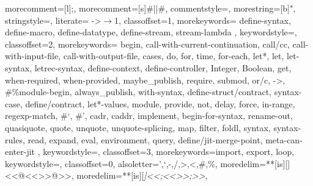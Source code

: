 


 {
  morecomment=[l]{;},         %
  morecomment=[s]{\#|}{|\#},  %
  commentstyle={\color{ForestGreen}\slshape\sffamily},
  morestring=[b]",
  stringstyle=\color{red},
  literate=%
    {->}{{$\rightarrow$}}1,
  classoffset=1,
    morekeywords={
      define-syntax, define-macro, define-datatype, define-stream, stream-lambda
    },
    keywordstyle=\color{blue},
  classoffset=2,
    morekeywords={
      begin, call-with-current-continuation, call/cc, call-with-input-file, call-with-output-file,
      cases, do, for, time, for-each,
      let*, let, let-syntax, letrec-syntax,
      define-context, define-controller, Integer, Boolean, get, when-required, when-provided,
      maybe_publish, require, submod, or/c, ->, \#\%module-begin, always_publish, with-syntax, define-struct/contract, syntax-case, define/contract,
      let*-values,
      module, provide,
      not,
      delay, force, in-range, regexp-match,
      \#`, \#',
      cadr, caddr,
      implement, begin-for-syntax, rename-out,
      quasiquote, quote, unquote, unquote-splicing,
      map, filter, foldl, syntax, syntax-rules, read, expand, eval, environment, query,
      define/jit-merge-point, meta-can-enter-jit
    },
    keywordstyle=\color{blue},
  classoffset=3,
    morekeywords={import, export, loop},
    keywordstyle=\color{Purple},
  classoffset=0,
  alsoletter={',`,-,/,>,<,\#,\%},
  moredelim=**[is][\color{lightgray}]{<<@<<}{>>@>>},
  moredelim=**[is][\itshape\color{OliveGreen}]{<<;<<}{>>;>>},
}

